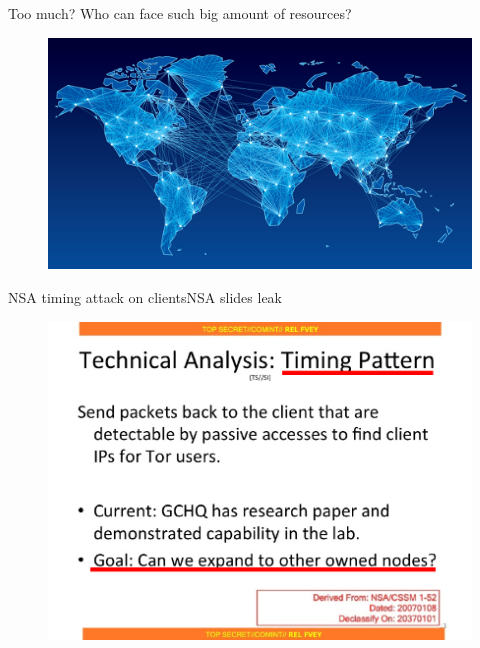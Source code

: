 \begin{frame}{Too much?}
	\centering
	Who can face such big amount of resources?

	\begin{figure}
		\centering
		\includegraphics[scale=0.50]{imgs/bignet.jpg}
	\end{figure}

\end{frame}

\begin{frame}{NSA timing attack on clients}{NSA slides leak}
	\begin{figure}
		\centering
		\includegraphics[scale=0.35]{imgs/nsa_timing1.png}
	\end{figure}
\end{frame}

